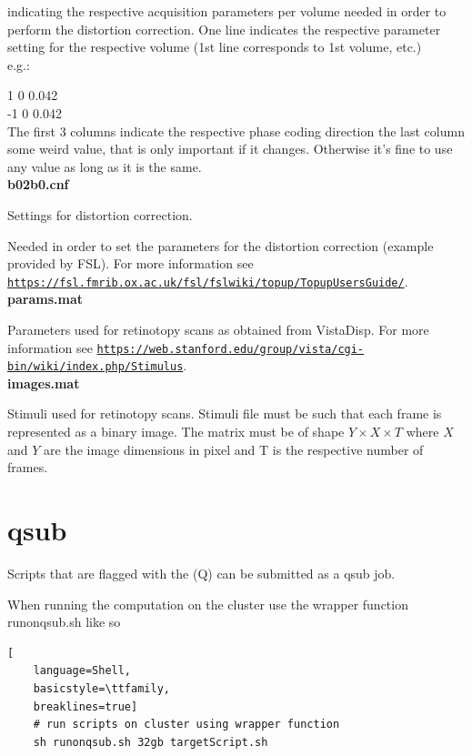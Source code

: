 \documentclass[12pt,a4paper]{scrartcl}
\begin{document}
\noindent indicating the respective acquisition parameters per volume needed in order to perform the distortion correction. One line indicates the respective parameter setting for the respective volume (1st line corresponds to 1st volume, etc.)\\

\noindent e.g.:

 1 0 0.042\\
 -1 0 0.042\\

The first 3 columns indicate the respective phase coding direction the last column some weird value, that is only important if it changes. Otherwise it's fine to use any value as long as it is the same.\\

\noindent\textbf{b02b0.cnf}

\noindent Settings for distortion correction.

Needed in order to set the parameters for the distortion correction (example provided by FSL). For more information see \href{https://fsl.fmrib.ox.ac.uk/fsl/fslwiki/topup/TopupUsersGuide/}{\nolinkurl{https://fsl.fmrib.ox.ac.uk/fsl/fslwiki/topup/TopupUsersGuide/}}.\\

\noindent\textbf{params.mat}

\noindent Parameters used for retinotopy scans as obtained from VistaDisp. For more information see \href{https://web.stanford.edu/group/vista/cgi-bin/wiki/index.php/Stimulus}{\nolinkurl{https://web.stanford.edu/group/vista/cgi-bin/wiki/index.php/Stimulus}}.\\

\noindent\textbf{images.mat}

\noindent Stimuli used for retinotopy scans. Stimuli file must be such that each frame is represented as a binary image. The matrix must be of shape $Y \times X \times T$ where $X$ and $Y$ are the image dimensions in pixel and T is the respective number of frames.

\section{qsub}
Scripts that are flagged with the (Q) can be submitted as a qsub job.

\noindent When running the computation on the cluster use the wrapper function runonqsub.sh like so
\begin{lstlisting}[
    language=Shell,
    basicstyle=\ttfamily,
    breaklines=true]
    # run scripts on cluster using wrapper function
    sh runonqsub.sh 32gb targetScript.sh
\end{lstlisting}
\end{document}
